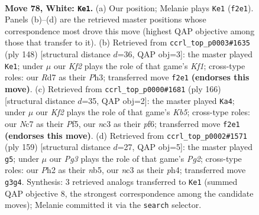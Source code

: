\documentclass[11pt]{article}
\begin{document}
\clearpage

\begin{figure}[p]\centering
\begin{subfigure}{0.46\textwidth}\centering
\resizebox{\linewidth}{!}{%
\newchessgame
\chessboard[
  setfen={8/PbNR4/6k1/8/1p3P2/2n3PB/5K1P/8 w - - 24 78},
  showmover=false,
  pgfstyle=straightmove, color=movearrow, markmove={f2-e1}
]}
\caption{}
\end{subfigure}\hfill
\begin{subfigure}{0.46\textwidth}\centering
\resizebox{\linewidth}{!}{%
\newchessgame
\chessboard[
  setfen={8/8/1b6/1P6/5pBp/3k3P/6P1/5K2 w - - 24 75},
  showmover=false,
  pgfstyle=straightmove, color=movearrow, markmove={f1-e1}
]}
\caption{}
\end{subfigure}
\\[4pt]
\begin{subfigure}{0.46\textwidth}\centering
\resizebox{\linewidth}{!}{%
\newchessgame
\chessboard[
  setfen={2B5/b7/3k1p1p/1K3P1P/2P5/8/8/8 w - - 9 84},
  showmover=false,
  pgfstyle=straightmove, color=movearrow, markmove={b5-a4}
]}
\caption{}
\end{subfigure}\hfill
\begin{subfigure}{0.46\textwidth}\centering
\resizebox{\linewidth}{!}{%
\newchessgame
\chessboard[
  setfen={8/5kp1/7p/1N6/1B5P/1n2K1P1/2b5/8 b - - 7 80},
  showmover=false,
  pgfstyle=straightmove, color=movearrow, markmove={g7-g5}
]}
\caption{}
\end{subfigure}
\caption{\textbf{Move 78, White: \texttt{Ke1}.} (a) Our position; Melanie plays \texttt{Ke1} (\texttt{f2e1}). Panels (b)--(d) are the retrieved master positions whose correspondence most drove this move (highest QAP objective among those that transfer to it). (b) Retrieved from \texttt{ccrl\_top\_p0003\#1635} (ply 148) [structural distance $d$=36, QAP obj=3]: the master played \texttt{Ke1}; under $\mu$ our \emph{Kf2} plays the role of that game's \emph{Kf1}; cross-type roles: our \emph{R}d7 as their \emph{P}h3; transferred move \texttt{f2e1} \textbf{(endorses this move)}. (c) Retrieved from \texttt{ccrl\_top\_p0000\#1681} (ply 166) [structural distance $d$=35, QAP obj=2]: the master played \texttt{Ka4}; under $\mu$ our \emph{Kf2} plays the role of that game's \emph{Kb5}; cross-type roles: our \emph{N}c7 as their \emph{P}f5, our \emph{n}c3 as their \emph{p}f6; transferred move \texttt{f2e1} \textbf{(endorses this move)}. (d) Retrieved from \texttt{ccrl\_top\_p0002\#1571} (ply 159) [structural distance $d$=27, QAP obj=5]: the master played \texttt{g5}; under $\mu$ our \emph{Pg3} plays the role of that game's \emph{Pg2}; cross-type roles: our \emph{P}h2 as their \emph{n}b5, our \emph{n}c3 as their \emph{p}h4; transferred move \texttt{g3g4}. Synthesis: 3 retrieved analogs transferred to \texttt{Ke1} (summed QAP objective 8, the strongest correspondence among the candidate moves); Melanie committed it via the \texttt{search} selector.}
\label{fig:thought-m154}
\end{figure}
\end{document}
